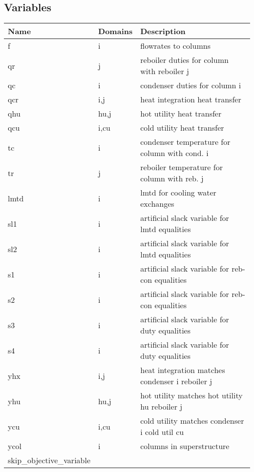 \documentclass[11pt]{article}
\begin{document}
\subsection*{Variables}
\begin{tabularx}{\textwidth}{| l | l | X |}
\hline
\textbf{Name} & \textbf{Domains} & \textbf{Description}\\
\hline
\endhead

f & i & flowrates to columns\\
qr & j & reboiler duties for column with reboiler j\\
qc & i & condenser duties for column i\\
qcr & i,j & heat integration heat transfer\\
qhu & hu,j & hot utility heat transfer\\
qcu & i,cu & cold utility heat transfer\\
tc & i & condenser temperature for column with cond. i\\
tr & j & reboiler temperature for column with reb. j\\
lmtd & i & lmtd for cooling water exchanges\\
sl1 & i & artificial slack variable for lmtd equalities\\
sl2 & i & artificial slack variable for lmtd equalities\\
s1 & i & artificial slack variable for reb-con equalities\\
s2 & i & artificial slack variable for reb-con equalities\\
s3 & i & artificial slack variable for duty equalities\\
s4 & i & artificial slack variable for duty equalities\\
yhx & i,j & heat integration matches condenser i reboiler j\\
yhu & hu,j & hot utility matches hot utility hu reboiler j\\
ycu & i,cu & cold utility matches condenser i cold util cu\\
ycol & i & columns in superstructure\\
skip\_objective\_variable &  & \\
\hline
\end{tabularx}
\end{document}
